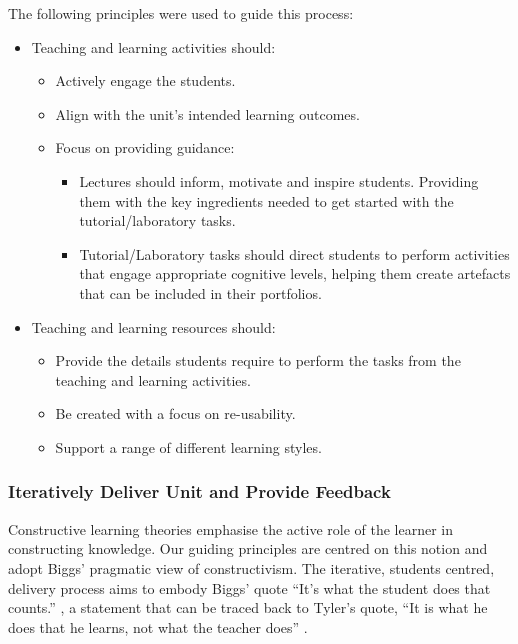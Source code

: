 The following principles were used to guide this process:
\begin{itemize}[noitemsep,nolistsep]
	\item Teaching and learning activities should:
	\begin{itemize}[noitemsep,nolistsep]
	 	\item Actively engage the students.
	 	\item Align with the unit's intended learning outcomes.
	 	\item Focus on providing guidance:
	 	\begin{itemize}[noitemsep,nolistsep]
		 	\item Lectures should inform, motivate and inspire students. Providing them with the key ingredients needed to get started with the tutorial/laboratory tasks.
		 	\item Tutorial/Laboratory tasks should direct students to perform activities that engage appropriate cognitive levels, helping them create artefacts that can be included in their portfolios.
	 	\end{itemize}
	 \end{itemize} 

	\item Teaching and learning resources should:
	\begin{itemize}[noitemsep,nolistsep]
		\item Provide the details students require to perform the tasks from the teaching and learning activities.
		\item Be created with a focus on re-usability.
		\item Support a range of different learning styles.
	\end{itemize}
\end{itemize}


\subsubsection{Iteratively Deliver Unit and Provide Feedback} %
\label{ssub:deliver_unit}

Constructive learning theories emphasise the active role of the learner in constructing knowledge. Our guiding principles are centred on this notion and adopt Biggs' pragmatic view of constructivism. The iterative, students centred, delivery process aims to embody Biggs' quote ``It's what the student does that counts.'' \cite{Biggs:1996c}, a statement that can be traced back to Tyler's quote, ``It is what he does that he learns, not what the teacher does'' \cite{Tyler:1969}.


